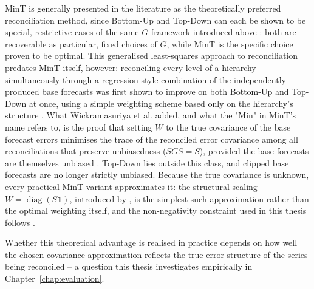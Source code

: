 MinT is generally presented in the literature as the theoretically preferred reconciliation method, since Bottom-Up and Top-Down can each be shown to be special, restrictive cases of the same $G$ framework introduced above \cite{Wickramasuriya:2019}: both are recoverable as particular, fixed choices of $G$, while MinT is the specific choice proven to be optimal. This generalised least-squares approach to reconciliation predates MinT itself, however: reconciling every level of a hierarchy simultaneously through a regression-style combination of the independently produced base forecasts was first shown to improve on both Bottom-Up and Top-Down at once, using a simple weighting scheme based only on the hierarchy's structure \cite{Hyndman:2011}. What Wickramasuriya et al. added, and what the "Min" in MinT's name refers to, is the proof that setting $W$ to the true covariance of the base forecast errors minimises the trace of the reconciled error covariance among all reconciliations that preserve unbiasedness ($SGS = S$), provided the base forecasts are themselves unbiased \cite{Wickramasuriya:2019}. Top-Down lies outside this class, and clipped base forecasts are no longer strictly unbiased. Because the true covariance is unknown, every practical MinT variant approximates it: the structural scaling $W = \operatorname{diag}(S\mathbf{1})$, introduced by \textcite{Athanasopoulos:2017}, is the simplest such approximation rather than the optimal weighting itself, and the non-negativity constraint used in this thesis follows \textcite{Wickramasuriya:2020}.

Whether this theoretical advantage is realised in practice depends on how well the chosen covariance approximation reflects the true error structure of the series being reconciled -- a question this thesis investigates empirically in Chapter~\ref{chap:evaluation}.